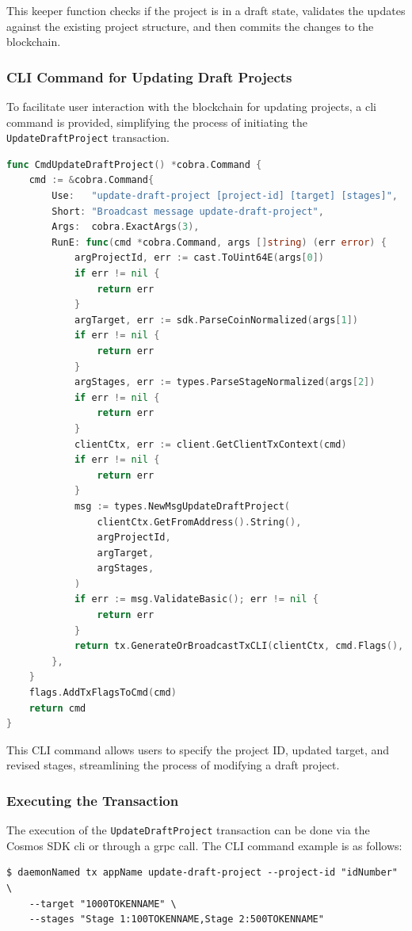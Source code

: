 This keeper function checks if the project is in a draft state, validates the updates against the existing project structure, and then commits the changes to the blockchain.

\subsubsection{CLI Command for Updating Draft Projects}

To facilitate user interaction with the blockchain for updating projects, a \gls{cli} command is provided, simplifying the process of initiating the \texttt{UpdateDraftProject} transaction.

\newpage
\begin{lstlisting}[language=go, caption=Create Project CLI definition, label={lst:update-draft-cli}]
func CmdUpdateDraftProject() *cobra.Command {
	cmd := &cobra.Command{
		Use:   "update-draft-project [project-id] [target] [stages]",
		Short: "Broadcast message update-draft-project",
		Args:  cobra.ExactArgs(3),
		RunE: func(cmd *cobra.Command, args []string) (err error) {
			argProjectId, err := cast.ToUint64E(args[0])
			if err != nil {
				return err
			}
			argTarget, err := sdk.ParseCoinNormalized(args[1])
			if err != nil {
				return err
			}
			argStages, err := types.ParseStageNormalized(args[2])
			if err != nil {
				return err
			}
			clientCtx, err := client.GetClientTxContext(cmd)
			if err != nil {
				return err
			}
			msg := types.NewMsgUpdateDraftProject(
				clientCtx.GetFromAddress().String(),
				argProjectId,
				argTarget,
				argStages,
			)
			if err := msg.ValidateBasic(); err != nil {
				return err
			}
			return tx.GenerateOrBroadcastTxCLI(clientCtx, cmd.Flags(), msg)
		},
	}
	flags.AddTxFlagsToCmd(cmd)
	return cmd
}
\end{lstlisting}

This CLI command allows users to specify the project ID, updated target, and revised stages, streamlining the process of modifying a draft project.

\subsubsection{Executing the Transaction}

The execution of the \texttt{UpdateDraftProject} transaction can be done via the Cosmos SDK \gls{cli} or through a \gls{grpc} call. The CLI command example is as follows:

\begin{verbatim}
$ daemonNamed tx appName update-draft-project --project-id "idNumber" \
    --target "1000TOKENNAME" \
    --stages "Stage 1:100TOKENNAME,Stage 2:500TOKENNAME"
\end{verbatim}

